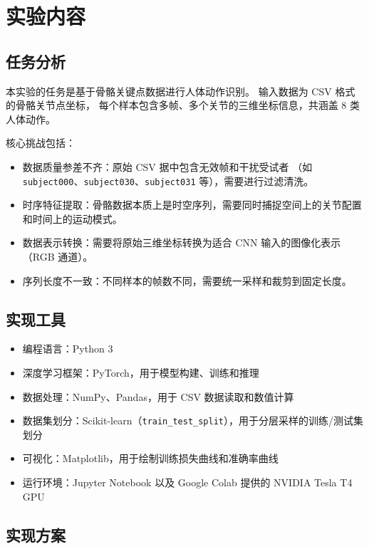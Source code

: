 \documentclass[UTF8]{ctexart}
\begin{document}
\section{实验内容}

\subsection{任务分析}

本实验的任务是基于骨骼关键点数据进行人体动作识别。
输入数据为 CSV 格式的骨骼关节点坐标，
每个样本包含多帧、多个关节的三维坐标信息，共涵盖 8 类人体动作。

核心挑战包括：

\begin{itemize}
  \item 数据质量参差不齐：原始 CSV 据中包含无效帧和干扰受试者
        （如 \texttt{subject000}、\texttt{subject030}、\texttt{subject031} 等），需要进行过滤清洗。
  \item 时序特征提取：骨骼数据本质上是时空序列，需要同时捕捉空间上的关节配置和时间上的运动模式。
  \item 数据表示转换：需要将原始三维坐标转换为适合 CNN 输入的图像化表示（RGB 通道）。
  \item 序列长度不一致：不同样本的帧数不同，需要统一采样和裁剪到固定长度。
\end{itemize}

\subsection{实现工具}

\begin{itemize}
  \item 编程语言：Python 3
  \item 深度学习框架：PyTorch，用于模型构建、训练和推理
  \item 数据处理：NumPy、Pandas，用于 CSV 数据读取和数值计算
  \item 数据集划分：Scikit-learn（\texttt{train\_test\_split}），用于分层采样的训练/测试集划分
  \item 可视化：Matplotlib，用于绘制训练损失曲线和准确率曲线
  \item 运行环境：Jupyter Notebook 以及 Google Colab 提供的 NVIDIA Tesla T4 GPU
\end{itemize}

\subsection{实现方案}
\end{document}
